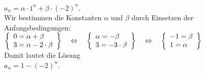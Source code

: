 \documentclass{article}
\begin{document}
\begin{enumerate}
      \\[0.2cm]
      \hspace*{1.3cm} $a_n = \alpha \cdot  1^n + \beta \cdot  (-2)^n$. \\[0.2cm]
      Wir bestimmen die Konstanten $\alpha$ und $\beta$ durch Einsetzen
      der Anfangsbedingungen: 
      \\[0.2cm]
      \hspace*{1.3cm}
       $
      \left\{\begin{array}[c]{lcl}
        0 = \alpha + \beta \\
        3 = \alpha - 2\cdot \beta \\
      \end{array}\right\} \quad \Leftrightarrow\quad
      \left\{\begin{array}[c]{lcl}
        \alpha = -\beta \\
        3 = -3\cdot \beta  \\
      \end{array}\right\} \quad \Leftrightarrow\quad
      \left\{\begin{array}[c]{lcl}
        -1 = \beta  \\
        1 = \alpha \\
      \end{array}\right\} 
      $
      \\[0.2cm]
      Damit lautet die L\"osung 
      \\[0.2cm]
      \hspace*{1.3cm} $a_n = 1 - (-2)^n$.
\end{enumerate}
\end{document}
